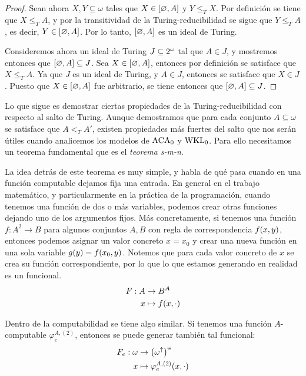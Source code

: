 \begin{agregado}
\begin{agregado}
\begin{proof}
	Sean ahora $X, Y\subseteq\omega$ tales que $X\in\bra*{\varnothing, A}$ y $Y\leq_{T} X$. Por definición se tiene que $X\leq_{T} A$, y por la transitividad de la Turing-reducibilidad se sigue que $Y\leq_{T} A$, es decir, $Y\in\bra*{\varnothing, A}$. Por lo tanto, $\bra*{\varnothing, A}$ es un ideal de Turing.

	Consideremos ahora un ideal de Turing $J\subseteq\CPOTENCIA{\omega}$ tal que $A\in J$, y mostremos entonces que $\bra*{\varnothing, A}\subseteq J$. Sea $X\in\bra*{\varnothing, A}$, entonces por definición se satisface que $X\leq_{T} A$. Ya que $J$ es un ideal de Turing, y $A\in J$, entonces se satisface que $X\in J$. Puesto que $X\in\bra*{\varnothing, A}$ fue arbitrario, se tiene entonces que $\bra*{\varnothing, A}\subseteq J$.
\end{proof}

Lo que sigue es demostrar ciertas propiedades de la Turing-reducibilidad con respecto al salto de Turing. Aunque demostramos que para cada conjunto $A\subseteq\omega$ se satisface que $A <_{T} A'$, existen propiedades más fuertes del salto que nos serán útiles cuando analicemos los modelos de $\ACA$ y $\WKL$. Para ello necesitamos un teorema fundamental que es el \emph{teorema s-m-n}.

La idea detrás de este teorema es muy simple, y habla de qué pasa cuando en una función computable dejamos fija una entrada. En general en el trabajo matemático, y particularmente en la práctica de la programación, cuando tenemos una función de dos o más variables, podemos crear otras funciones dejando uno de los argumentos fijos. Más concretamente, si tenemos una función $f: A^{2}\to B$ para algunos conjuntos $A, B$ con regla de correspondencia $f\pa*{x, y}$, entonces podemos asignar un valor concreto $x = x_{0}$ y crear una nueva función en una sola variable $g\pa*{y} = f\pa*{x_{0}, y}$. Notemos que para cada valor concreto de $x$ se crea su función correspondiente, por lo que lo que estamos generando en realidad es un funcional.
\begin{align*}
	F: A&\to B^{A}\\
	x&\mapsto f\pa*{x,\cdot}
\end{align*}

Dentro de la computabilidad se tiene algo similar. Si tenemos una función $A$-computable $\varphi_{e}^{A, (2)}$, entonces se puede generar también tal funcional:
\begin{align*}
	F_{e}:\omega&\to\pa*{\omega^{\DIVERGE}}^{\omega}\\
	x&\mapsto\varphi_{e}^{A, (2)}\pa*{x,\cdot}
\end{align*}


\end{agregado}
\end{agregado}
